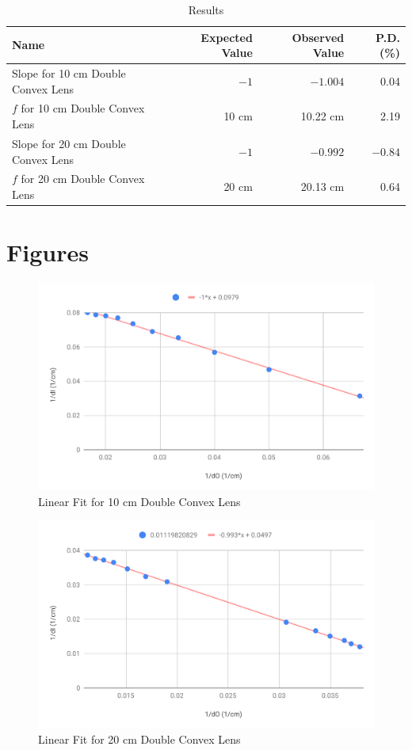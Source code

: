 %
\begin{table}[ht]
    \centering
    \begin{tabular}{|l|r|r|r|}
        \hline
        Name & Expected Value & Observed Value & P.D. (\%) \\
        \hline
        Slope for 10 cm Double Convex Lens & $-1$ & $-1.004$ & 0.04 \\
        $f$ for 10 cm Double Convex Lens & 10 cm & 10.22 cm & 2.19 \\
        Slope for 20 cm Double Convex Lens & $-1$ & $-0.992$ & $-0.84$ \\
        $f$ for 20 cm Double Convex Lens & 20 cm & 20.13 cm & 0.64 \\
        \hline
    \end{tabular}
    \caption{Results}
    \label{table.08.results}
\end{table}
%
\FloatBarrier
\newpage
\section{Figures}
%
\begin{figure}[ht]
    \centering
    \includegraphics[scale=0.74]{image/08-lenses/10cm.pdf}
    \caption{Linear Fit for 10 cm Double Convex Lens}
    \label{figure.08.10cm}
\end{figure}
%
\begin{figure}[ht]
    \centering
    \includegraphics[scale=0.74]{image/08-lenses/20cm.pdf}
    \caption{Linear Fit for 20 cm Double Convex Lens}
    \label{figure.08.20cm}
\end{figure}
%